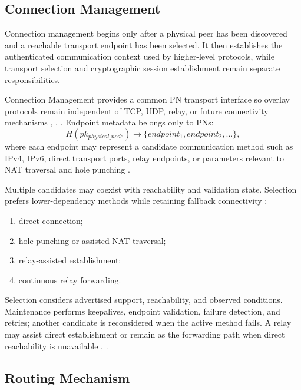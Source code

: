 \documentclass[
  12pt,
  oneside,
  a4paper,
  chapter=TITLE,
  section=TITLE,
  english,
  brazil
]{abntex2}
\begin{document}
\subsection{Connection Management}

Connection management begins only after a physical peer has been discovered and a reachable transport endpoint has been selected. It then establishes the authenticated communication context used by higher-level protocols, while transport selection and cryptographic session establishment remain separate responsibilities.

\thesisconnectiontikz

Connection Management provides a common PN transport interface so overlay protocols remain independent of TCP, UDP, relay, or future connectivity mechanisms \cite{li2022unreachable}, \cite{augustine2022byzantine}, \cite{mirzaei2018pk}. Endpoint metadata belongs only to PNs:
\[
H(pk_{physical\_node}) \rightarrow \{endpoint_1, endpoint_2, \dots\},
\]
where each endpoint may represent a candidate communication method such as IPv4, IPv6, direct transport ports, relay endpoints, or parameters relevant to NAT traversal and hole punching \cite{li2022unreachable}.

Multiple candidates may coexist with reachability and validation state. Selection prefers lower-dependency methods while retaining fallback connectivity \cite{li2022unreachable}:
\begin{enumerate}
    \item direct connection;
    \item hole punching or assisted NAT traversal;
    \item relay-assisted establishment;
    \item continuous relay forwarding.
\end{enumerate}

Selection considers advertised support, reachability, and observed conditions. Maintenance performs keepalives, endpoint validation, failure detection, and retries; another candidate is reconsidered when the active method fails. A relay may assist direct establishment or remain as the forwarding path when direct reachability is unavailable \cite{li2022unreachable}, \cite{augustine2022byzantine}.



\subsection{Routing Mechanism}
\end{document}
